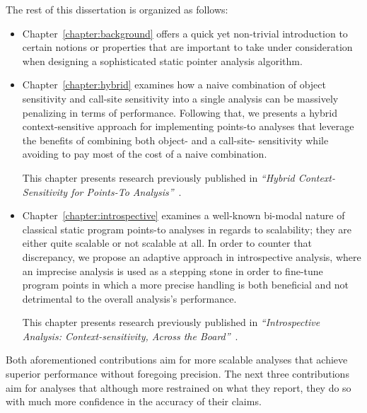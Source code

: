 The rest of this dissertation is organized as follows:
\begin{itemize}[$\bullet$]
\item Chapter~\ref{chapter:background} offers a quick yet non-trivial introduction to certain notions or properties that are important to take under consideration when designing a sophisticated static pointer analysis algorithm.

\item Chapter~\ref{chapter:hybrid} examines how a naive combination of object sensitivity and call-site sensitivity into a single analysis can be massively penalizing in terms of performance. Following that, we presents a hybrid context-sensitive approach for implementing points-to analyses that leverage the benefits of combining both object- and a call-site- sensitivity while avoiding to pay most of the cost of a naive combination.

This chapter presents research previously published in \emph{``Hybrid Context-Sensitivity for Points-To Analysis''}~\cite{pldi:2013:Kastrinis}.

\item Chapter~\ref{chapter:introspective} examines a well-known bi-modal nature of classical static program points-to analyses in regards to scalability; they are either quite scalable or not scalable at all. In order to counter that discrepancy, we propose an adaptive approach in introspective analysis, where an imprecise analysis is used as a stepping stone in order to fine-tune program points in which a more precise handling is both beneficial and not detrimental to the overall analysis's performance.

This chapter presents research previously published in \emph{``Introspective Analysis: Context-sensitivity, Across the Board''}~\cite{pldi:2014:Smaragdakis}.
\end{itemize}

Both aforementioned contributions aim for more scalable analyses that achieve superior performance without foregoing precision. The next three contributions aim for analyses that although more restrained on what they report, they do so with much more confidence in the accuracy of their claims.

